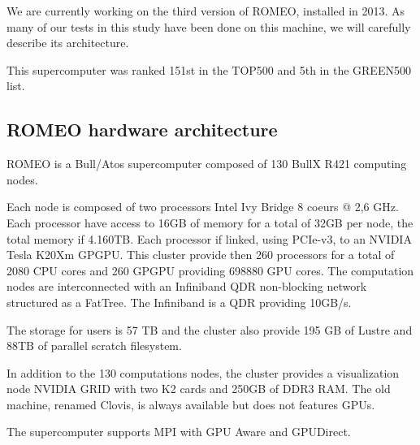 We are currently working on the third version of ROMEO, installed in 2013. 
As many of our tests in this study have been done on this machine, we will carefully describe its architecture. 

This supercomputer was ranked 151st in the TOP500 and 5th in the GREEN500 list. 

\subsection{ROMEO hardware architecture}
ROMEO is a Bull/Atos supercomputer composed of 130 BullX R421 computing nodes. 

Each node is composed of two processors Intel Ivy Bridge 8 coeurs @ 2,6 GHz. 
Each processor have access to 16GB of memory for a total of 32GB per node, the total memory if 4.160TB. 
Each processor if linked, using PCIe-v3, to an NVIDIA Tesla K20Xm GPGPU. 
This cluster provide then 260 processors for a total of 2080 CPU cores and 260 GPGPU providing 698880 GPU cores. 
The computation nodes are interconnected with an Infiniband QDR non-blocking network structured as a FatTree. 
The Infiniband is a QDR providing 10GB/s. 

The storage for users is 57 TB and the cluster also provide 195 GB of Lustre and 88TB of parallel scratch filesystem. 

In addition to the 130 computations nodes, the cluster provides a visualization node NVIDIA GRID with two K2 cards and 250GB of DDR3 RAM. 
The old machine, renamed Clovis, is always available but does not features GPUs. 

The supercomputer supports MPI with GPU Aware and GPUDirect. 
